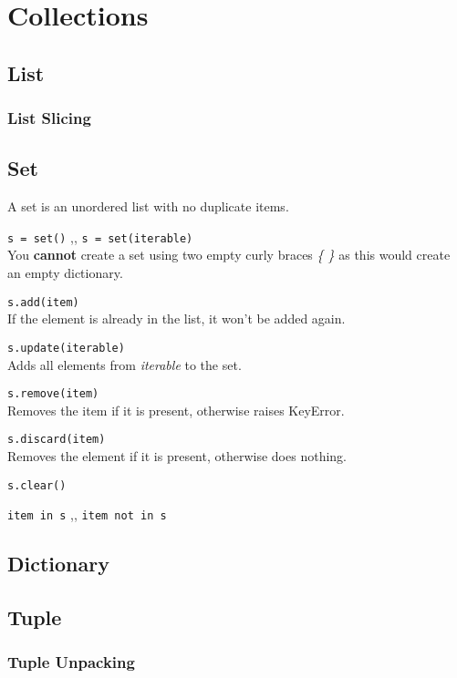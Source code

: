 \section{Collections}

  \subsection{List}

    \subsubsection{List Slicing}

  \subsection{Set}
    A set is an unordered list with no duplicate items.

    \begin{itemize}
       \texttt{s = set()} \sep{,}
      \texttt{s = set(iterable)} \\
      You \textbf{cannot} create a set using two empty curly braces \textit{\{ \}} as this would
      create an empty dictionary.

       \texttt{s.add(item)} \\
      If the element is already in the list, it won't be added again.

       \texttt{s.update(iterable)} \\
      Adds all elements from \textit{iterable} to the set.

       \texttt{s.remove(item)} \\
      Removes the item if it is present, otherwise raises KeyError.

       \texttt{s.discard(item)} \\
      Removes the element if it is present, otherwise does nothing.

       \texttt{s.clear()}

       \texttt{item in s} \sep{,}
      \texttt{item not in s}
    \end{itemize}

  \subsection{Dictionary}

  \subsection{Tuple}

    \subsubsection{Tuple Unpacking}
    